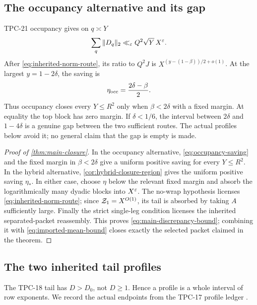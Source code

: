 \subsection{The occupancy alternative and its gap}

TPC-21 occupancy gives on \(q\asymp Y\)
\[
 \sum_q\|D_q\|_2\ll_\varepsilon Q^2\sqrt Y\,X^\varepsilon.
\]
After \eqref{eq:inherited-norm-route}, its ratio to \(Q^2J\) is
\(X^{(y-(1-\beta))/2+o(1)}\).  At the largest
\(y=1-2\delta\), the saving is
\begin{equation}
 \eta_{\rm occ}=\frac{2\delta-\beta}{2}.
 \label{eq:occupancy-saving}
\end{equation}
Thus occupancy closes every \(Y\le R^2\) only when
\(\beta<2\delta\) with a fixed margin.  At equality the top block has
zero margin.  If \(\delta<1/6\), the interval between \(2\delta\) and
\(1-4\delta\) is a genuine gap between the two sufficient routes.  The
actual profiles below avoid it; no general claim that the gap is empty
is made.

\begin{proof}[Proof of \cref{thm:main-closure}]
In the occupancy alternative, \eqref{eq:occupancy-saving} and the fixed
margin in \(\beta<2\delta\) give a uniform positive saving for every
\(Y\le R^2\).  In the hybrid alternative,
\cref{cor:hybrid-closure-region} gives the uniform positive saving
\(\eta_*\).  In either case, choose \(\eta\) below the relevant fixed
margin and absorb the logarithmically many dyadic blocks into
\(X^\varepsilon\).  The no-wrap hypothesis licenses
\eqref{eq:inherited-norm-route}; since \(\mathcal Z_1=X^{O(1)}\), its tail is
absorbed by taking \(A\) sufficiently large.  Finally the strict
single-leg condition licenses the inherited separated-packet
reassembly.  This proves \eqref{eq:main-discrepancy-bound}; combining it
with \eqref{eq:imported-mean-bound} closes exactly the selected packet
claimed in the theorem.
\end{proof}

\subsection{The two inherited tail profiles}

The TPC-18 tail has \(D>D_0\), not \(D\ge1\).  Hence a profile is a
whole interval of row exponents.  We record the actual endpoints from
the TPC-17 profile ledger \citep{WangTPC17}.

